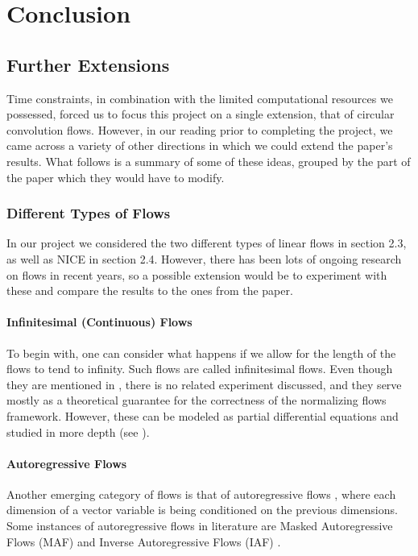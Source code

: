 \chapter{Conclusion}

\section{Further Extensions}
Time constraints, in combination with the limited computational resources we possessed, forced us to focus this project on a single extension, that of circular convolution flows.  However, in our reading prior to completing the project, we came across a variety of other directions in which we could extend the paper's results. What follows is a summary of some of these ideas, grouped by the part of the paper which they would have to modify.

\subsection{Different Types of Flows}
In our project we considered the two different types of linear flows in section 2.3, as well as NICE in section 2.4. However, there has been lots of ongoing research on flows in recent years, so a possible extension would be to experiment with these and compare the results to the ones from the paper.

\subsubsection{Infinitesimal (Continuous) Flows}
To begin with, one can consider what happens if we allow for the length of the flows to tend to infinity. Such flows are called infinitesimal flows. Even though they are mentioned in \cite{main}, there is no related experiment discussed, and they serve mostly as a theoretical guarantee for the correctness of the normalizing flows framework. However, these can be modeled as partial differential equations and studied in more depth (see \cite{inf_flows}).

\subsubsection{Autoregressive Flows}
Another emerging category of flows is that of autoregressive flows \cite{autoregressive}, where each dimension of a vector variable is being conditioned on the previous dimensions.  Some instances of autoregressive flows in literature are Masked Autoregressive Flows (MAF)\cite{maf} and Inverse Autoregressive Flows (IAF) \cite{autoregressive}.

